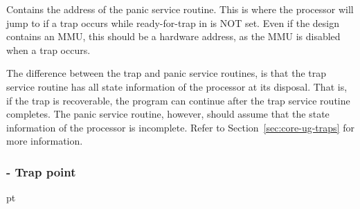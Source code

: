 \normalsize\vskip 6pt
\noindent Contains the address of the panic service routine. This is where the processor
will jump to if a trap occurs while ready-for-trap in  is NOT set.
Even if the design contains an MMU, this should be a hardware address, as the
MMU is disabled when a trap occurs.

The difference between the trap and panic service routines, is that the trap
service routine has all state information of the processor at its disposal. That
is, if the trap is recoverable, the program can continue after the trap service
routine completes. The panic service routine, however, should assume that the
state information of the processor is incomplete. Refer to
Section~\ref{sec:core-ug-traps} for more information.
\subsubsection{ - Trap point}
\label{reg:TP}
\label{reg:TP}
 pt\relax\noindent\footnotesize
